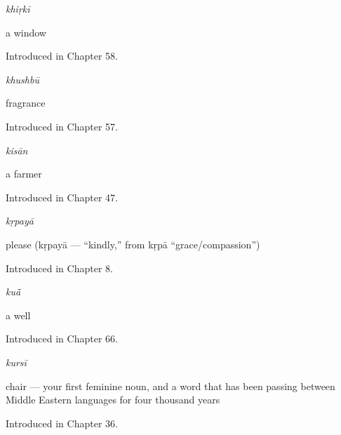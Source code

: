 \noindent\begin{minipage}[t]{\linewidth}
\raggedright
\textbf{}\enspace\emph{khiṛkī}\par
\small a window\par
\footnotesize Introduced in Chapter 58.
\end{minipage}\par\medskip

\noindent\begin{minipage}[t]{\linewidth}
\raggedright
\textbf{}\enspace\emph{khushbū}\par
\small fragrance\par
\footnotesize Introduced in Chapter 57.
\end{minipage}\par\medskip

\noindent\begin{minipage}[t]{\linewidth}
\raggedright
\textbf{}\enspace\emph{kisān}\par
\small a farmer\par
\footnotesize Introduced in Chapter 47.
\end{minipage}\par\medskip

\noindent\begin{minipage}[t]{\linewidth}
\raggedright
\textbf{}\enspace\emph{kṛpayā}\par
\small please (kṛpayā — \textquotedblleft{}kindly,\textquotedblright{} from kṛpā \textquotedblleft{}grace/compassion\textquotedblright{})\par
\footnotesize Introduced in Chapter 8.
\end{minipage}\par\medskip

\noindent\begin{minipage}[t]{\linewidth}
\raggedright
\textbf{}\enspace\emph{kuā̃}\par
\small a well\par
\footnotesize Introduced in Chapter 66.
\end{minipage}\par\medskip

\noindent\begin{minipage}[t]{\linewidth}
\raggedright
\textbf{}\enspace\emph{kursī}\par
\small chair — your first feminine noun, and a word that has been passing between Middle Eastern languages for four thousand years\par
\footnotesize Introduced in Chapter 36.
\end{minipage}\par\medskip


